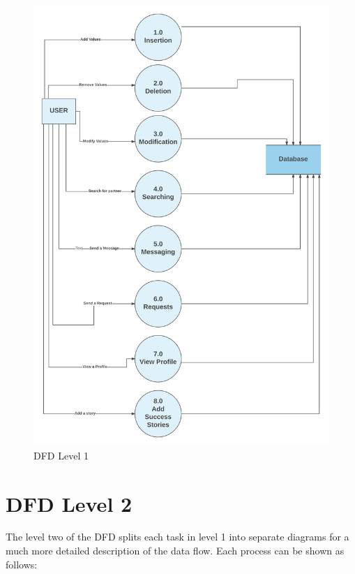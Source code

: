 \documentclass[12pt]{report}
\begin{document}
\begin{figure}[!htb]
    \centering
    \includegraphics[width=1\textwidth]{df-l1.png}
    \caption{DFD Level 1}
    \label{fig:dfd l1}
\end{figure}



\section{DFD Level 2}
The level two of the DFD splits each task in level 1 into separate diagrams for a much more detailed description of the data flow. Each process can be shown as follows: 
\end{document}
